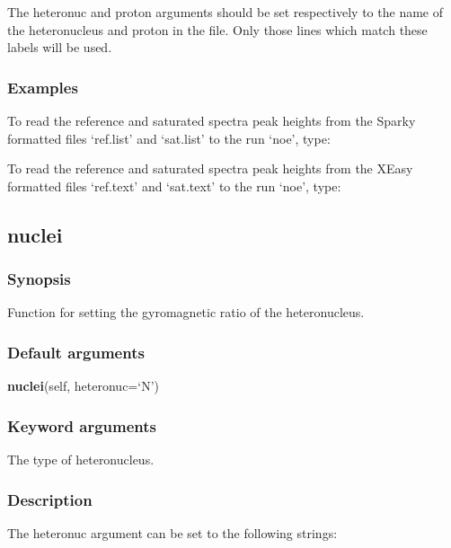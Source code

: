 The heteronuc and proton arguments should be set respectively to the name of the
heteronucleus and proton in the file.  Only those lines which match these labels will be
used.


\subsubsection{Examples}

To read the reference and saturated spectra peak heights from the Sparky formatted files
`ref.list' and `sat.list' to the run `noe', type:


To read the reference and saturated spectra peak heights from the XEasy formatted files
`ref.text' and `sat.text' to the run `noe', type:




\newpage

\subsection{nuclei}


\subsubsection{Synopsis}

Function for setting the gyromagnetic ratio of the heteronucleus.

\subsubsection{Default arguments}

\textsf{\textbf{nuclei}(self, heteronuc=`N')}


\subsubsection{Keyword arguments}

  The type of heteronucleus.

\subsubsection{Description}

The heteronuc argument can be set to the following strings:

